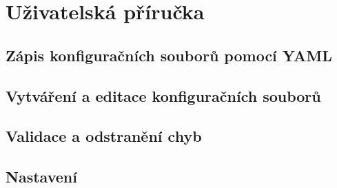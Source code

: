 \documentclass[FM,bw,DP]{tulthesis}
\begin{document}

\chapter{Uživatelská příručka}

\section{Zápis konfiguračních souborů pomocí YAML}

\section{Vytváření a editace konfiguračních souborů}

\section{Validace a odstranění chyb}

\section{Nastavení} 



%
%
%
%
%
%
%
%
%
%
%
%
%
%
\end{document}
